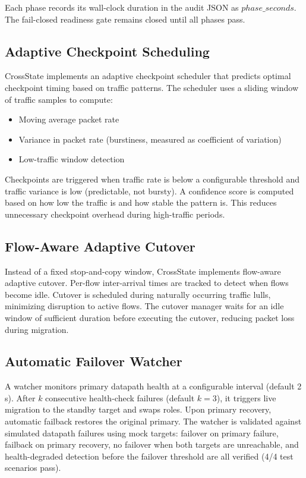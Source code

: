 \documentclass[10pt, conference]{IEEEtran}
\begin{document}
Each phase records its wall-clock duration in the audit JSON as $phase\_seconds$. The fail-closed readiness gate remains closed until all phases pass.

\subsection{Adaptive Checkpoint Scheduling}
\label{subsec:adaptive_sched}
CrossState implements an adaptive checkpoint scheduler that predicts optimal checkpoint timing based on traffic patterns. The scheduler uses a sliding window of traffic samples to compute:
\begin{itemize}
    \item Moving average packet rate
    \item Variance in packet rate (burstiness, measured as coefficient of variation)
    \item Low-traffic window detection
\end{itemize}

Checkpoints are triggered when traffic rate is below a configurable threshold and traffic variance is low (predictable, not bursty). A confidence score is computed based on how low the traffic is and how stable the pattern is. This reduces unnecessary checkpoint overhead during high-traffic periods.

\subsection{Flow-Aware Adaptive Cutover}
\label{subsec:adaptive_cutover}
Instead of a fixed stop-and-copy window, CrossState implements flow-aware adaptive cutover. Per-flow inter-arrival times are tracked to detect when flows become idle. Cutover is scheduled during naturally occurring traffic lulls, minimizing disruption to active flows. The cutover manager waits for an idle window of sufficient duration before executing the cutover, reducing packet loss during migration.

\subsection{Automatic Failover Watcher}
\label{subsec:failover}
A watcher monitors primary datapath health at a configurable interval (default 2\,s). After $k$ consecutive health-check failures (default $k=3$), it triggers live migration to the standby target and swaps roles. Upon primary recovery, automatic failback restores the original primary. The watcher is validated against simulated datapath failures using mock targets: failover on primary failure, failback on primary recovery, no failover when both targets are unreachable, and health-degraded detection before the failover threshold are all verified (4/4 test scenarios pass).
\end{document}

